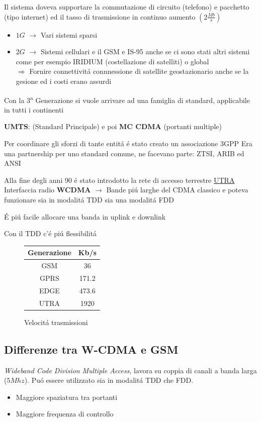 \documentclass{article}
\begin{document}
Il sistema doveva supportare la commutazione di circuito (telefono) e pacchetto (tipo internet) ed il tasso di trasmissione in continuo aumento $\left(2\frac{Mb}{s}\right)$

\begin{itemize}
    \item $1G$ $\rightarrow$ Vari sistemi sparsi
    \item $2G$ $\rightarrow$ Sistemi cellulari e il GSM e IS-95 anche se ci sono stati altri sistemi come per esempio IRIDIUM (costellazione di satelliti) o global\\
        $\Rightarrow$ Fornire connettivit\'a connnessione di satellite geostazionario anche se la gesione ed i costi erano assurdi
\end{itemize}

Con la 3\textsuperscript{a} Generazione si vuole arrivare ad una famiglia di standard, applicabile in tutti i continenti

\textbf{UMTS}: (Standard Principale) e poi \textbf{MC CDMA} (portanti multiple)


Per coordinare gli sforzi di tante entit\'a \'e stato creato un associazione 3GPP
Era una partnership per uno standard comune, ne facevano parte: ZTSI, ARIB ed ANSI

Alla fine degli anni 90 \'e stato introdotto la rete di accesso terrestre \underline{UTRA}
Interfaccia radio \textbf{WCDMA} $\rightarrow$ Bande pi\'u larghe del CDMA classico e  poteva funzionare sia in modalit\'a TDD sia una modalit\'a FDD

\'E pi\'u facile allocare una banda in uplink e downlink

Con il TDD c'\'e pi\'u flessibilit\'a

\begin{figure}
\begin{tabular}{c c}
    Generazione & Kb/s\\
    \hline
    GSM & 36\\
    GPRS &171.2\\
    EDGE &473.6\\
    UTRA &1920\\
\end{tabular}
\centering
\caption{Velocit\'a trasmissioni}
\end{figure}


\subsection{Differenze tra W-CDMA e GSM }
\textit{Wideband Code Division Multiple Access}, lavora su coppia di canali a banda larga ($5Mhz$). Pu\'o essere utilizzato sia in modalit\'a TDD che FDD.
\begin{itemize}
    \item Maggiore spaziatura tra portanti
    \item Maggiore frequenza di controllo

\end{itemize}
\end{document}

